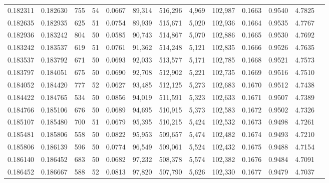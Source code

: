 \begin{tabular}{rrrrrrrrrrrrr}
0.182311 & 0.182630 &   755 &  54 &                                     0.0667 &  89,314 & 516,296 &   4,969 & 102,987 & 0.1663 & 0.9540 & 4.7825 \\
0.182635 & 0.182935 &   625 &  51 &                                     0.0754 &  89,939 & 515,671 &   5,020 & 102,936 & 0.1664 & 0.9535 & 4.7767 \\
0.182936 & 0.183242 &   804 &  50 &                                     0.0585 &  90,743 & 514,867 &   5,070 & 102,886 & 0.1665 & 0.9530 & 4.7692 \\
0.183242 & 0.183537 &   619 &  51 &                                     0.0761 &  91,362 & 514,248 &   5,121 & 102,835 & 0.1666 & 0.9526 & 4.7635 \\
0.183537 & 0.183792 &   671 &  50 &                                     0.0693 &  92,033 & 513,577 &   5,171 & 102,785 & 0.1668 & 0.9521 & 4.7573 \\
0.183797 & 0.184051 &   675 &  50 &                                     0.0690 &  92,708 & 512,902 &   5,221 & 102,735 & 0.1669 & 0.9516 & 4.7510 \\
0.184052 & 0.184420 &   777 &  52 &                                     0.0627 &  93,485 & 512,125 &   5,273 & 102,683 & 0.1670 & 0.9512 & 4.7438 \\
0.184422 & 0.184765 &   534 &  50 &                                     0.0856 &  94,019 & 511,591 &   5,323 & 102,633 & 0.1671 & 0.9507 & 4.7389 \\
0.184766 & 0.185106 &   676 &  50 &                                     0.0689 &  94,695 & 510,915 &   5,373 & 102,583 & 0.1672 & 0.9502 & 4.7326 \\
0.185107 & 0.185480 &   700 &  51 &                                     0.0679 &  95,395 & 510,215 &   5,424 & 102,532 & 0.1673 & 0.9498 & 4.7261 \\
0.185481 & 0.185806 &   558 &  50 &                                     0.0822 &  95,953 & 509,657 &   5,474 & 102,482 & 0.1674 & 0.9493 & 4.7210 \\
0.185806 & 0.186139 &   596 &  50 &                                     0.0774 &  96,549 & 509,061 &   5,524 & 102,432 & 0.1675 & 0.9488 & 4.7154 \\
0.186140 & 0.186452 &   683 &  50 &                                     0.0682 &  97,232 & 508,378 &   5,574 & 102,382 & 0.1676 & 0.9484 & 4.7091 \\
0.186452 & 0.186667 &   588 &  52 &                                     0.0813 &  97,820 & 507,790 &   5,626 & 102,330 & 0.1677 & 0.9479 & 4.7037 \\

\end{tabular}
